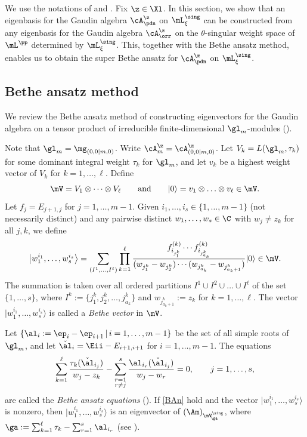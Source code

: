 \documentclass[11pt, reqno]{amsart}
\theoremstyle{definition}
\theoremstyle{remark}
\numberwithin{equation}{section}
\begin{document}
We use the notations of  and .
Fix $\z \in \Xl$.
In this section, we show that an eigenbasis for the Gaudin algebra $\cA_\pdn^\z$ on $\mL^\sing_\xi$ can be constructed from any eigenbasis for the Gaudin algebra $\cA_\orr^\z$ on the $\theta$-singular weight space of $\mL^\pp$ determined by $\mL^\sing_\xi$.
This, together with the Bethe ansatz method, enables us to obtain the super Bethe ansatz for $\cA_\pdn^\z$ on $\mL^\sing_\xi$.


\subsection{Bethe ansatz method} \label{BAM}
We review the Bethe ansatz method of constructing eigenvectors for the Gaudin algebra on a tensor product of irreducible finite-dimensional $\gl_m$-modules (\cite{BF, FFR}).

Note that $\gl_m=\mg_{(0,0|m,0)}$.
Write $\cA_{m}^\z=\cA_{(0,0|m,0)}^\z$.
Let $V_k=L(\gl_m, \tau_k)$ for some dominant integral weight $\tau_k$ for $\gl_m$, and let $v_k$ be a highest weight vector of $V_k$ for $k=1, \ldots, \ell$.
Define
$$
\mV =V_1  \otimes \cdots \otimes  V_\ell \qquad \text{and} \qquad |0 \rangle=v_1 \otimes \ldots \otimes v_\ell \in \mV.
$$
Let $f_j=E_{j+1,j}$ for $j=1, \ldots, m-1$.
Given $i_1,\ldots,i_s \in \{1,\ldots, m-1 \}$ (not necessarily distinct) and any pairwise distinct $w_1,\ldots, w_s \in \C$ with $w_j \ne z_k$ for all $j,k$,
we define
$$
 \big|w_1^{i_1},\ldots,w_s^{i_s} \big\rangle =\sum_{(I^1,\ldots,I^\ell)} \prod_{k=1}^\ell  \frac{f_{i_{j^k_1}}^{(k)} \cdots f_{i_{j^k_{a_k}}}^{(k)}} {(w_{j^k_1}-w_{j^k_2}) \cdots (w_{j^k _{a_k}}-w_{j^k _{a_k+1}})} |0 \rangle   \in \mV .
$$
The summation is taken over all ordered partitions $I^1\cup I^2\cup \ldots \cup I^\ell$ of the set $\{1, \ldots, s \}$, where $I^k :=\big\{j^k _1,j^k _2,\ldots,j^k _{a_k } \big\}$ and $w_{j^k _{a_k+1}}:=z_k$ for $k=1, \ldots, \ell$.
The vector $\big|w_1^{i_1},\ldots,w_s^{i_s} \big\rangle$ is called a \emph{Bethe vector} in $\mV $.


Let $\{ \al_i:=\ep_i-\ep_{i+1} \, | \, i=1, \ldots, m-1 \}$ be the set of all simple roots of $\gl_m$, and let $\check\al_i=\Eii-E_{i+1,i+1}$ for $i=1, \ldots, m-1$.
The equations
\begin{equation} \label{BAn}
\sum_{k=1}^\ell\frac{\tau_k (\check \al_{i_j})}{w_j-z_k}-\sum_{\substack{r=1 \\ r \ne j}}^s \frac{\al_{i_r}(\check\al_{i_j})}{w_j-w_r}=0,  \qquad j=1,\ldots, s,
\end{equation}
are called the \emph{Bethe ansatz equations} (\cite{BF, FFR}).
If \eqref{BAn} hold and the vector $\big|w_1^{i_1},\ldots,w_s^{i_s} \big\rangle$ is nonzero, then $\big|w_1^{i_1},\ldots,w_s^{i_s} \big\rangle$ is an eigenvector of $(\Am)_{\mV^\sing_{\! \ga}}$, where $\ga:=\sum_{k=1}^\ell \tau_k-\sum_{r=1}^s \al_{i_r}$ (see \cite{MTV06, RV}).
\end{document}

